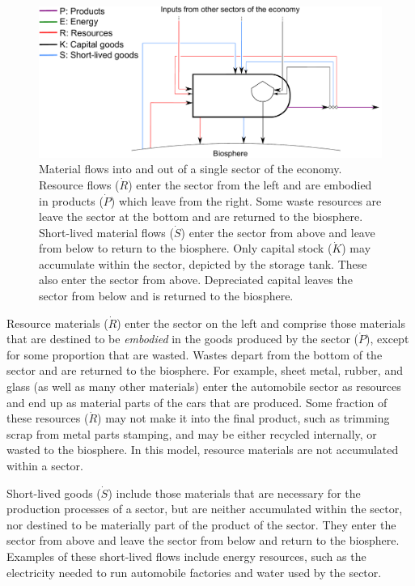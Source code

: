 \begin{figure}[!ht]
\centering{}
\includegraphics[width=0.8\linewidth]{Part_1/Chapter_Materials/images/PERKS_basic_unit_materials.pdf}
\caption[Material flows into and out of a single sector 
of the economy.]{Material flows into and out of 
a single sector of the economy. 
Resource flows ($\dot{R}$) enter the sector from the left 
and are embodied in products ($\dot{P}$) which leave from the right. 
Some waste resources are leave the sector at the 
bottom and are returned to the biosphere.
Short-lived material flows ($\dot{S}$) 
enter the sector from above and leave from below to return to the biosphere. 
Only capital stock ($\dot{K}$) may accumulate within the sector,
depicted by the storage tank.
These also enter the sector from above. 
Depreciated capital leaves the sector from below and is returned to the biosphere.}
\label{fig:PERKS_materials}
\end{figure}

Resource materials ($\dot{R}$) 
enter the sector on the left 
and comprise those materials that are destined to be \emph{embodied} 
in the goods produced by the sector ($\dot{P}$), 
except for some proportion that are wasted.
Wastes depart from the bottom of the sector and are
returned to the biosphere. 
For example, sheet metal, rubber, and glass
(as well as many other materials) 
enter the automobile sector as resources 
and end up as material parts of the cars that are produced. 
Some fraction of these resources ($\dot{R}$) may not make it into the final product, 
such as trimming scrap from metal parts stamping, 
and may be either recycled internally, 
or wasted to the biosphere. 
In this model, resource materials are not accumulated within a sector.

Short-lived goods ($\dot{S}$)  
include those materials 
that are necessary for the production processes of a sector, 
but are neither accumulated within the sector, 
nor destined to be materially part of the product of the sector. 
They enter the sector from above and leave the sector from
below and return to the biosphere. 
Examples of these short-lived flows include energy resources, such as
the electricity needed to run automobile factories 
and water used by the sector. 

